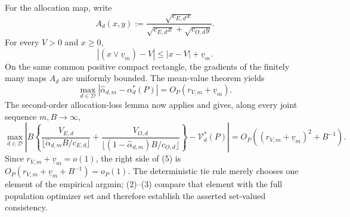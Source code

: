 For the allocation map, write
\[
 A_d(x,y):=
 \frac{\sqrt{c_{E,d}x}}
 {\sqrt{c_{E,d}x}+\sqrt{c_{O,d}y}}.
\]
For every \(V>0\) and \(x\ge0\),
\[
 |(x\vee\underline v_m)-V|
 \le |x-V|+\underline v_m.
\]
On the same common positive compact rectangle, the gradients of the finitely many maps \(A_d\) are uniformly bounded.  The mean-value theorem yields
\[
 \max_{d\in\mathcal D}
 |\widehat\alpha_{d,m}-\alpha_d^*(P)|
 =O_P(r_{V,m}+\underline v_m).                                             \tag{4}
\]
The second-order allocation-loss lemma now applies and gives, along every joint sequence \(m,B\to\infty\),
\[
 \max_{d\in\mathcal D}\left|
 B\left\{
 \frac{V_{E,d}}{\lfloor\widehat\alpha_{d,m}B/c_{E,d}\rfloor}
 +\frac{V_{O,d}}{\lfloor(1-\widehat\alpha_{d,m})B/c_{O,d}\rfloor}
 \right\}-\mathcal V_d^*(P)\right|
 =O_P\!\left((r_{V,m}+\underline v_m)^2+B^{-1}\right).                    \tag{5}
\]
Since \(r_{V,m}+\underline v_m=o(1)\), the right side of (5) is
\(O_P(r_{V,m}+\underline v_m+B^{-1})=o_P(1)\).  The deterministic tie rule merely chooses one element of the empirical argmin; (2)--(3) compare that element with the full population optimizer set and therefore establish the asserted set-valued consistency.
